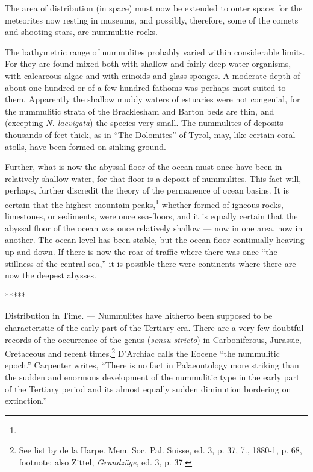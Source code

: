 \documentclass[a4paper, 12pt, oneside]{article}
\begin{document}
The area of distribution (in space) must now be extended to outer space; for the meteorites now resting in museums, and possibly, therefore, some of the comets and shooting stars, are nummulitic rocks.

The bathymetric range of nummulites probably varied within considerable limits. For they are found mixed both with shallow and fairly deep-water organisms, with calcareous algae and with crinoids and glass-sponges. A moderate depth of about one hundred or of a few hundred fathoms was perhaps most suited to them. Apparently the shallow muddy waters of estuaries were not congenial, for the nummulitic strata of the Bracklesham and Barton beds are thin, and (excepting \emph{N. laevigata}) the species very small. The nummulites of deposits thousands of feet thick, as in ``The Dolomites'' of Tyrol, may, like certain coral-atolls, have been formed on sinking ground.

Further, what is now the abyssal floor of the ocean must once have been in relatively shallow water, for that floor is a deposit of nummulites. This fact will, perhaps, further discredit the theory of the permanence of ocean basins. It is certain that the highest mountain peaks,\footnote{} whether formed of igneous rocks, limestones, or sediments, were once sea-floors, and it is equally certain that the abyssal floor of the ocean was once relatively shallow --- now in one area, now in another. The ocean level has been stable, but the ocean floor continually heaving up and down. If there is now the roar of traffic where there was once ``the stillness of the central sea,'' it is possible there were continents where there are now the deepest abysses.

\centerline{*\hspace{15mm}*\hspace{15mm}*\hspace{15mm}*\hspace{15mm}*}
\bigskip

Distribution in Time. --- Nummulites have hitherto been supposed to be characteristic of the early part of the Tertiary era. There are a very few doubtful records of the occurrence of the genus (\emph{sensu stricto}) in Carboniferous, Jurassic, Cretaceous and recent times.\footnote{See list by de la Harpe. Mem. Soc. Pal. Suisse, ed. 3, p. 37, 7., 1880-1, p. 68, footnote; also Zittel, \emph{Grundzüge}, ed. 3, p. 37.} D'Archiac calls the Eocene ``the nummulitic epoch.'' Carpenter writes, ``There is no fact in Palaeontology more striking than the sudden and enormous development of the nummulitic type in the early part of the Tertiary period and its almost equally sudden diminution bordering on extinction.''
\end{document}
